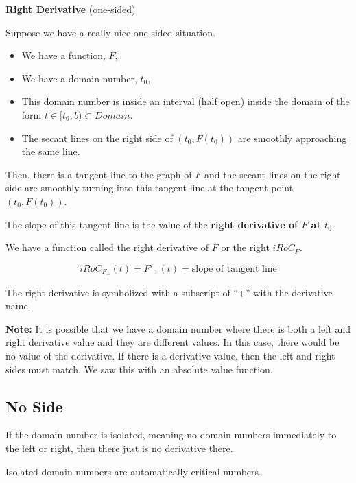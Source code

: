 \documentclass{ximera}
\begin{document}
\begin{definition} \textbf{\textcolor{green!50!black}{Right Derivative}}  (one-sided) 


Suppose we have a really nice one-sided situation.


\begin{itemize}
\item We have a function, $F$, 
\item We have a domain number, $t_0$, 
\item This domain number is inside an interval (half open) inside the domain of the form  $t \in [t_0, b) \subset Domain$. 
\item The secant lines on the right side of $(t_0, F(t_0))$ are smoothly approaching the same line.
\end{itemize}

Then, there is a tangent line to the graph of $F$ and the secant lines on the right side are smoothly turning into this tangent line at the tangent point $(t_0, F(t_0))$. 

The slope of this tangent line is the value of the \textbf{right derivative of $F$ at $t_0$}.


We have a function called the right derivative of $F$ or the right $iRoC_F$. 

\[
iRoC_{F_{+}}(t) =F'_{+}(t) = \text{slope of tangent line}
\]


The right derivative is symbolized with a subscript of ``+'' with the derivative name. 

\end{definition}



\textbf{Note:} It is possible that we have a domain number where there is both a left and right derivative value and they are different values.  In this case, there would be no value of the derivative.  If there is a derivative value, then the left and right sides must match.  We saw this with an absolute value function.





\subsection*{No Side}


If the domain number is isolated, meaning no domain numbers immediately to the left or right, then there just is no derivative there. 

Isolated domain numbers are automatically critical numbers.
\end{document}
